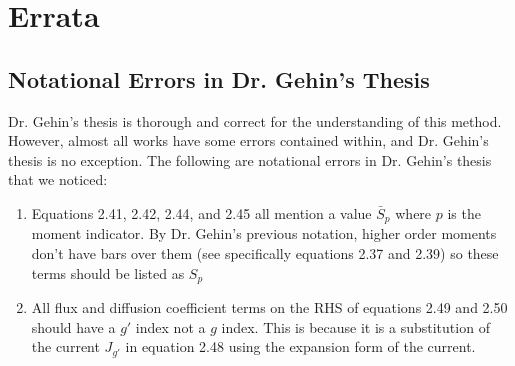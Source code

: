 \section{Errata}

\subsection{Notational Errors in Dr. Gehin's Thesis}

Dr. Gehin's thesis is thorough and correct for the understanding of this method.
However, almost all works have some errors contained within, and Dr. Gehin's thesis is no exception.
The following are notational errors in Dr. Gehin's thesis that we noticed:
\begin{enumerate}
    \item Equations 2.41, 2.42, 2.44, and 2.45 all mention a value $\bar{S}_p$ where $p$ is the moment indicator.
    By Dr. Gehin's previous notation, higher order moments don't have bars over them (see specifically equations 2.37 and 2.39) so these terms should be listed as $S_p$
    \item All flux and diffusion coefficient terms on the RHS of equations 2.49 and 2.50 should have a $g'$ index not a $g$ index.
    This is because it is a substitution of the current $J_{g'}$ in equation 2.48 using the expansion form of the current.
\end{enumerate}












